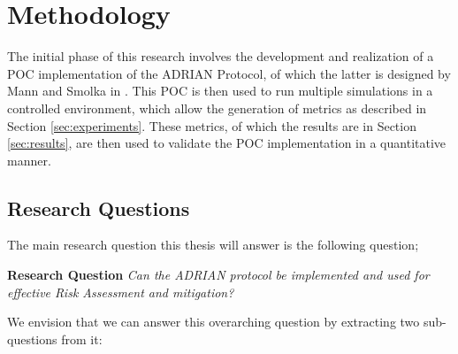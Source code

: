 \section{Methodology}
\label{sec:methodology}
The initial phase of this research involves the development and realization of a POC implementation of the ADRIAN Protocol, of which the latter is designed by Mann and Smolka in \cite{mann2023ADRIAN}. This POC is then used to run multiple simulations in a controlled environment, which allow the generation of metrics as described in Section \ref{sec:experiments}. These metrics, of which the results are in Section \ref{sec:results}, are then used to validate the POC implementation in a quantitative manner. 


\subsection{Research Questions}
\label{ssec:research-questions}

The main research question this thesis will answer is the following question;

\vspace{0.5em}
\textbf{Research Question}\label{rq} \emph{Can the ADRIAN protocol be implemented and used for effective Risk Assessment and mitigation?}\vspace{1em}

We envision that we can answer this overarching question by extracting two sub-questions from it:



